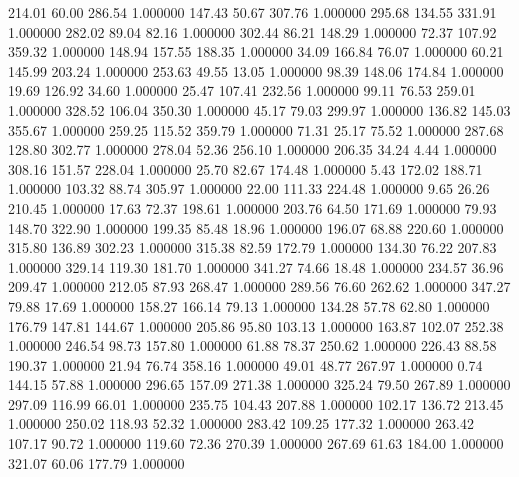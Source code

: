     214.01     60.00    286.54  1.000000
    147.43     50.67    307.76  1.000000
    295.68    134.55    331.91  1.000000
    282.02     89.04     82.16  1.000000
    302.44     86.21    148.29  1.000000
     72.37    107.92    359.32  1.000000
    148.94    157.55    188.35  1.000000
     34.09    166.84     76.07  1.000000
     60.21    145.99    203.24  1.000000
    253.63     49.55     13.05  1.000000
     98.39    148.06    174.84  1.000000
     19.69    126.92     34.60  1.000000
     25.47    107.41    232.56  1.000000
     99.11     76.53    259.01  1.000000
    328.52    106.04    350.30  1.000000
     45.17     79.03    299.97  1.000000
    136.82    145.03    355.67  1.000000
    259.25    115.52    359.79  1.000000
     71.31     25.17     75.52  1.000000
    287.68    128.80    302.77  1.000000
    278.04     52.36    256.10  1.000000
    206.35     34.24      4.44  1.000000
    308.16    151.57    228.04  1.000000
     25.70     82.67    174.48  1.000000
      5.43    172.02    188.71  1.000000
    103.32     88.74    305.97  1.000000
     22.00    111.33    224.48  1.000000
      9.65     26.26    210.45  1.000000
     17.63     72.37    198.61  1.000000
    203.76     64.50    171.69  1.000000
     79.93    148.70    322.90  1.000000
    199.35     85.48     18.96  1.000000
    196.07     68.88    220.60  1.000000
    315.80    136.89    302.23  1.000000
    315.38     82.59    172.79  1.000000
    134.30     76.22    207.83  1.000000
    329.14    119.30    181.70  1.000000
    341.27     74.66     18.48  1.000000
    234.57     36.96    209.47  1.000000
    212.05     87.93    268.47  1.000000
    289.56     76.60    262.62  1.000000
    347.27     79.88     17.69  1.000000
    158.27    166.14     79.13  1.000000
    134.28     57.78     62.80  1.000000
    176.79    147.81    144.67  1.000000
    205.86     95.80    103.13  1.000000
    163.87    102.07    252.38  1.000000
    246.54     98.73    157.80  1.000000
     61.88     78.37    250.62  1.000000
    226.43     88.58    190.37  1.000000
     21.94     76.74    358.16  1.000000
     49.01     48.77    267.97  1.000000
      0.74    144.15     57.88  1.000000
    296.65    157.09    271.38  1.000000
    325.24     79.50    267.89  1.000000
    297.09    116.99     66.01  1.000000
    235.75    104.43    207.88  1.000000
    102.17    136.72    213.45  1.000000
    250.02    118.93     52.32  1.000000
    283.42    109.25    177.32  1.000000
    263.42    107.17     90.72  1.000000
    119.60     72.36    270.39  1.000000
    267.69     61.63    184.00  1.000000
    321.07     60.06    177.79  1.000000
